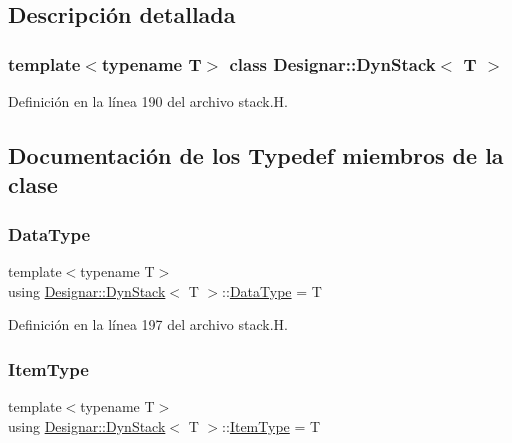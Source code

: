 \subsection{Descripción detallada}
\subsubsection*{template$<$typename T$>$\newline
class Designar\+::\+Dyn\+Stack$<$ T $>$}



Definición en la línea 190 del archivo stack.\+H.



\subsection{Documentación de los \textquotesingle{}Typedef\textquotesingle{} miembros de la clase}
\mbox{\label{class_designar_1_1_dyn_stack_afb7dc9ebd5c844450d997e38b195f3bb}} 
\subsubsection{\texorpdfstring{Data\+Type}{DataType}}
{\footnotesize\ttfamily template$<$typename T$>$ \\
using \hyperlink{class_designar_1_1_dyn_stack}{Designar\+::\+Dyn\+Stack}$<$ T $>$\+::\hyperlink{class_designar_1_1_fixed_array_a3e37931b909b840cb7a40fc73f12bcf5}{Data\+Type} =  T}



Definición en la línea 197 del archivo stack.\+H.

\mbox{\label{class_designar_1_1_dyn_stack_a2e50015faeef3234802046097db79f73}} 
\subsubsection{\texorpdfstring{Item\+Type}{ItemType}}
{\footnotesize\ttfamily template$<$typename T$>$ \\
using \hyperlink{class_designar_1_1_dyn_stack}{Designar\+::\+Dyn\+Stack}$<$ T $>$\+::\hyperlink{class_designar_1_1_fixed_array_abfeb4e683cee75ae782ad20294c4c808}{Item\+Type} =  T}



